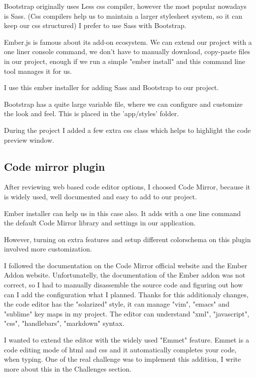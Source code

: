 \documentclass[12pt, a4paper, oneside, openright, medskipamount]{report}
\begin{document}
Bootstrap originally uses Less\cite{less} css compiler, however the most popular nowadays is Sass\cite{sass}. (Css compilers help us to maintain a larger stylesheet system, so it can keep our css structured) I prefer to use Sass with Bootstrap.

Ember.js is famous about its add-on ecosystem. We can extend our project with a one liner console command, we don't have to manually download, copy-paste files in our project, enough if we run a simple "ember install" and this command line tool manages it for us.

I use this ember installer for adding Sass and Bootstrap to our project.

Bootstrap has a quite large variable file, where we can configure and customize the look and feel. This is placed in the 'app/styles' folder.

During the project I added a few extra css class which helps to highlight the code preview window.

\subsection{Code mirror plugin} \label{codemirror}

After reviewing web based code editor options, I choosed Code Mirror, because it is widely used, well documented and easy to add to our project.

Ember installer can help us in this case also. It adds with a one line command the default Code Mirror library and settings in our application.

However, turning on extra features and setup different colorschema on this plugin involved more customization.

I followed the documentation on the Code Mirror official website and the Ember Addon website. Unfortunatelly, the documentation of the Ember addon was not correct, so I had to manually disassemble the source code and figuring out how can I add the configuration what I planned. Thanks for this additionaly changes, the code editor has the "solarized" style, it can manage "vim", "emacs" and "sublime" key maps in my project. The editor can understand "xml", "javascript", "css", "handlebars", "markdown" syntax.

I wanted to extend the editor with the widely used "Emmet" feature. Emmet is a code editing mode of html and css and it automatically completes your code, when typing. One of the real challenge was to implement this addition, I write more about this in the Challenges section.
\end{document}
